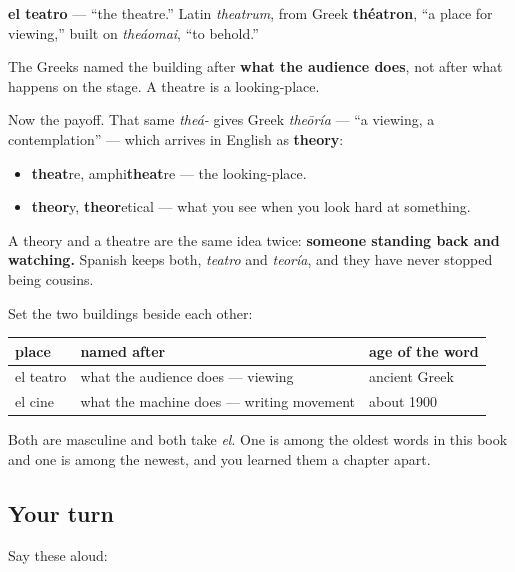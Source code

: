 \begin{cousinweb}
\textbf{el teatro} — \textquotedblleft{}the theatre.\textquotedblright{} Latin \emph{theatrum}, from Greek \textbf{théatron}, \textquotedblleft{}a place for viewing,\textquotedblright{} built on \emph{theáomai}, \textquotedblleft{}to behold.\textquotedblright{}

The Greeks named the building after \textbf{what the audience does}, not after what happens on the stage. A theatre is a looking-place.

Now the payoff. That same \emph{theá-} gives Greek \emph{theōría} — \textquotedblleft{}a viewing, a contemplation\textquotedblright{} — which arrives in English as \textbf{theory}:

\begin{itemize}
\raggedright
  \item \textbf{theat}re, amphi\textbf{theat}re — the looking-place.
  \item \textbf{theor}y, \textbf{theor}etical — what you see when you look hard at something.
\end{itemize}

A theory and a theatre are the same idea twice: \textbf{someone standing back and watching.} Spanish keeps both, \emph{teatro} and \emph{teoría}, and they have never stopped being cousins.
\end{cousinweb}

\begin{grammarlens}[title={Grammar Lens: two names, two ages}]
Set the two buildings beside each other:

\noindent
\begin{tabularx}{\linewidth}{@{}>{\raggedright\arraybackslash}X>{\raggedright\arraybackslash}X>{\raggedright\arraybackslash}X@{}}
\toprule
\textbf{place} & \textbf{named after} & \textbf{age of the word} \\
\midrule
el teatro & what the audience does — viewing & ancient Greek \\
el cine & what the machine does — writing movement & about 1900 \\
\bottomrule
\end{tabularx}

Both are masculine and both take \emph{el}. One is among the oldest words in this book and one is among the newest, and you learned them a chapter apart.
\end{grammarlens}

\subsection*{Your turn}
Say these aloud:

